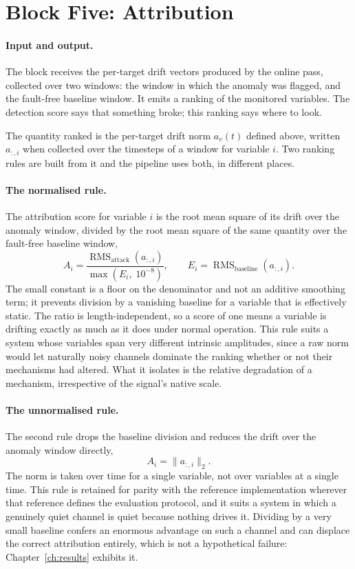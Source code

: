 \section{Block Five: Attribution}
\label{sec:method-attribution}
\label{sec:bg-attribution}

\paragraph{Input and output.} The block receives the per-target drift vectors produced by the online pass, collected over two windows: the window in which the anomaly was flagged, and the fault-free baseline window. It emits a ranking of the monitored variables. The detection score says that something broke; this ranking says where to look.

The quantity ranked is the per-target drift norm $a_v(t)$ defined above, written $a_{:,i}$ when collected over the timesteps of a window for variable $i$. Two ranking rules are built from it and the pipeline uses both, in different places.

\paragraph{The normalised rule.} The attribution score for variable $i$ is the root mean square of its drift over the anomaly window, divided by the root mean square of the same quantity over the fault-free baseline window,
\[
  A_i = \frac{\operatorname{RMS}_{\text{attack}}\!\left(a_{:,i}\right)}
             {\max\!\left(E_i,\; 10^{-8}\right)},
  \qquad
  E_i = \operatorname{RMS}_{\text{baseline}}\!\left(a_{:,i}\right).
\]
The small constant is a floor on the denominator and not an additive smoothing term; it prevents division by a vanishing baseline for a variable that is effectively static. The ratio is length-independent, so a score of one means a variable is drifting exactly as much as it does under normal operation. This rule suits a system whose variables span very different intrinsic amplitudes, since a raw norm would let naturally noisy channels dominate the ranking whether or not their mechanisms had altered. What it isolates is the relative degradation of a mechanism, irrespective of the signal's native scale.

\paragraph{The unnormalised rule.} The second rule drops the baseline division and reduces the drift over the anomaly window directly,
\[
  A_i = \lVert a_{:,i} \rVert_2 .
\]
The norm is taken over time for a single variable, not over variables at a single time. This rule is retained for parity with the reference implementation wherever that reference defines the evaluation protocol, and it suits a system in which a genuinely quiet channel is quiet because nothing drives it. Dividing by a very small baseline confers an enormous advantage on such a channel and can displace the correct attribution entirely, which is not a hypothetical failure: Chapter~\ref{ch:results} exhibits it.

